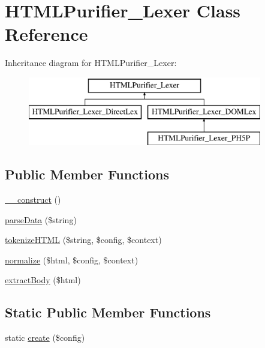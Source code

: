 \hypertarget{classHTMLPurifier__Lexer}{\section{H\+T\+M\+L\+Purifier\+\_\+\+Lexer Class Reference}
\label{classHTMLPurifier__Lexer}
}
Inheritance diagram for H\+T\+M\+L\+Purifier\+\_\+\+Lexer\+:\begin{figure}[H]
\begin{center}
\leavevmode
\includegraphics[height=3.000000cm]{classHTMLPurifier__Lexer}
\end{center}
\end{figure}
\subsection*{Public Member Functions}
\begin{DoxyCompactItemize}
\item 
\hyperlink{classHTMLPurifier__Lexer_a3a8cb5fd90a0e9cc65a9d24958884f51}{\+\_\+\+\_\+construct} ()
\item 
\hyperlink{classHTMLPurifier__Lexer_a4444f380da614edc88e8d6069f5c5b97}{parse\+Data} (\$string)
\item 
\hyperlink{classHTMLPurifier__Lexer_a207733a9dbacd22b2dfce50493122755}{tokenize\+H\+T\+M\+L} (\$string, \$config, \$context)
\item 
\hyperlink{classHTMLPurifier__Lexer_a01c2ce000fe0856a77532d749c3c7160}{normalize} (\$html, \$config, \$context)
\item 
\hyperlink{classHTMLPurifier__Lexer_abdcd2d9949060713eb7b02d65803dfce}{extract\+Body} (\$html)
\end{DoxyCompactItemize}
\subsection*{Static Public Member Functions}
\begin{DoxyCompactItemize}
\item 
static \hyperlink{classHTMLPurifier__Lexer_ac7f8fe627b8b6a4d0e08dcf893c15a9f}{create} (\$config)
\end{DoxyCompactItemize}

